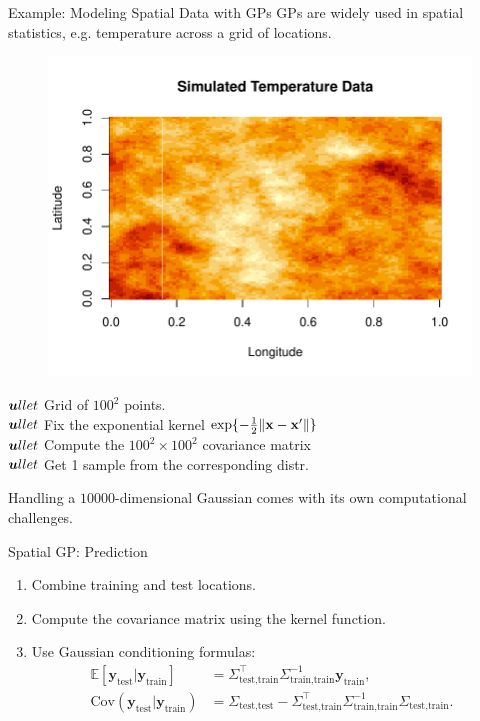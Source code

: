 \documentclass[11pt,handout,aspectratio=169]{beamer}
\begin{document}
\begin{frame}{Example: Modeling Spatial Data with GPs}
GPs are widely used in spatial statistics, e.g. temperature across a grid of locations.\\[3mm]
\begin{minipage}{7cm}
	\begin{figure}
	\includegraphics[width=
	\textwidth]{pics/GP_temp.pdf}
\end{figure}
\end{minipage}\begin{minipage}{8cm}
$\boldsymbol ullet$	Grid of $100^2$ points. \\[2mm]
$\boldsymbol ullet$ Fix the exponential kernel $\exp\{-\tfrac12\|\mathbf{x}-\mathbf{x}'\|\}$\\[2mm]
$\boldsymbol ullet$ Compute the $100^2\times 100^2$ covariance matrix\\[2mm]
$\boldsymbol ullet$ Get 1 sample from the corresponding distr.\\[2mm]
\end{minipage}
Handling a $10000$-dimensional Gaussian comes with its own computational challenges.  
\end{frame}

\begin{frame}{Spatial GP: Prediction}
\begin{enumerate}
    \item Combine training and test locations.
    \item Compute the covariance matrix using the kernel function.
    \item Use Gaussian conditioning formulas:
    \begin{align*}
        \mathbb{E}[\mathbf{y}_\text{test} | \mathbf{y}_\text{train}] &= \Sigma_\text{test,train}^\top \Sigma_\text{train,train}^{-1} \mathbf{y}_\text{train}, \\
        \text{Cov}(\mathbf{y}_\text{test} | \mathbf{y}_\text{train}) &= \Sigma_\text{test,test} - \Sigma_\text{test,train}^\top \Sigma_\text{train,train}^{-1} \Sigma_\text{test,train}.
    \end{align*}
\end{enumerate}
\end{frame}
\end{document}
